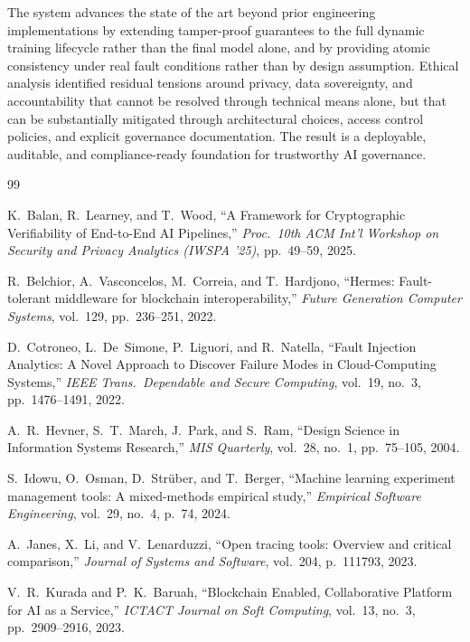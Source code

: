 \documentclass[10pt,twocolumn]{article}
\begin{document}
The system advances the state of the art beyond prior engineering implementations
by extending tamper-proof guarantees to the full dynamic training lifecycle rather than
the final model alone, and by providing atomic consistency under real fault conditions
rather than by design assumption. Ethical analysis identified residual tensions around
privacy, data sovereignty, and accountability that cannot be resolved through technical
means alone, but that can be substantially mitigated through architectural choices,
access control policies, and explicit governance documentation. The result is a
deployable, auditable, and compliance-ready foundation for trustworthy AI governance.

\balance
{\small
\setlength{\itemsep}{0pt}
\setlength{\parsep}{0pt}
\begin{thebibliography}{99}

K.~Balan, R.~Learney, and T.~Wood,
``A Framework for Cryptographic Verifiability of End-to-End AI Pipelines,''
\textit{Proc.\ 10th ACM Int'l Workshop on Security and Privacy Analytics (IWSPA '25)},
pp.\ 49--59, 2025.

R.~Belchior, A.~Vasconcelos, M.~Correia, and T.~Hardjono,
``Hermes: Fault-tolerant middleware for blockchain interoperability,''
\textit{Future Generation Computer Systems}, vol.~129, pp.\ 236--251, 2022.

D.~Cotroneo, L.~De~Simone, P.~Liguori, and R.~Natella,
``Fault Injection Analytics: A Novel Approach to Discover Failure Modes in Cloud-Computing Systems,''
\textit{IEEE Trans.\ Dependable and Secure Computing}, vol.~19, no.~3, pp.\ 1476--1491, 2022.

A.~R.~Hevner, S.~T.~March, J.~Park, and S.~Ram,
``Design Science in Information Systems Research,''
\textit{MIS Quarterly}, vol.~28, no.~1, pp.\ 75--105, 2004.

S.~Idowu, O.~Osman, D.~Str\"{u}ber, and T.~Berger,
``Machine learning experiment management tools: A mixed-methods empirical study,''
\textit{Empirical Software Engineering}, vol.~29, no.~4, p.~74, 2024.

A.~Janes, X.~Li, and V.~Lenarduzzi,
``Open tracing tools: Overview and critical comparison,''
\textit{Journal of Systems and Software}, vol.~204, p.~111793, 2023.

V.~R.~Kurada and P.~K.~Baruah,
``Blockchain Enabled, Collaborative Platform for AI as a Service,''
\textit{ICTACT Journal on Soft Computing}, vol.~13, no.~3, pp.\ 2909--2916, 2023.


\end{thebibliography}}
\end{document}
